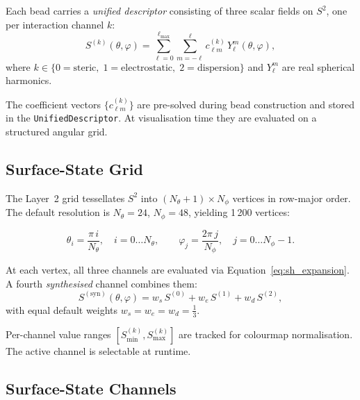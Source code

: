\documentclass[12pt, a4paper, oneside]{article}
\newcommand{\type}[1]{\texttt{#1}}
\newcommand{\SH}{Y_\ell^m}
\begin{document}
Each bead carries a \emph{unified descriptor} consisting of three
scalar fields on $S^2$, one per interaction channel $k$:
\begin{equation}
  S^{(k)}(\theta, \varphi)
    = \sum_{\ell=0}^{\ell_{\max}}
      \sum_{m=-\ell}^{\ell}
      c_{\ell m}^{(k)} \, \SH(\theta, \varphi),
  \label{eq:sh_expansion}
\end{equation}
where $k \in \{0 = \text{steric},\; 1 = \text{electrostatic},\;
2 = \text{dispersion}\}$ and $\SH$ are real spherical harmonics.

The coefficient vectors $\{c_{\ell m}^{(k)}\}$ are pre-solved during
bead construction and stored in the \type{UnifiedDescriptor}.  At
visualisation time they are evaluated on a structured angular grid.

\subsection{Surface-State Grid}

The Layer~2 grid tessellates $S^2$ into
$(N_\theta + 1) \times N_\phi$ vertices in row-major order.  The
default resolution is $N_\theta = 24$, $N_\phi = 48$, yielding
1\,200 vertices:

\begin{equation}
  \theta_i = \frac{\pi \, i}{N_\theta}, \quad i = 0 \ldots N_\theta,
  \qquad
  \varphi_j = \frac{2\pi \, j}{N_\phi}, \quad j = 0 \ldots N_\phi - 1.
  \label{eq:grid_coords}
\end{equation}

At each vertex, all three channels are evaluated via
Equation~\ref{eq:sh_expansion}.  A fourth \emph{synthesised} channel
combines them:
\begin{equation}
  S^{(\text{syn})}(\theta, \varphi)
    = w_s \, S^{(0)} + w_e \, S^{(1)} + w_d \, S^{(2)},
  \label{eq:synthesized}
\end{equation}
with equal default weights $w_s = w_e = w_d = \tfrac{1}{3}$.

Per-channel value ranges $[S_{\min}^{(k)}, S_{\max}^{(k)}]$ are
tracked for colourmap normalisation.  The active channel is selectable
at runtime.

\subsection{Surface-State Channels}
\end{document}
